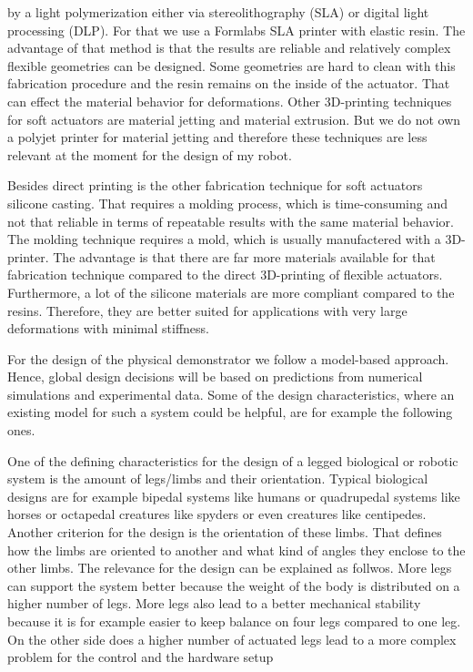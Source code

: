 by a light polymerization either via stereolithography (SLA) or digital light processing (DLP). For that we use a Formlabs SLA printer with elastic resin. The advantage of that method
is that the results are reliable and relatively complex flexible geometries can be designed. Some geometries are hard to clean with this fabrication procedure and the resin remains on
the inside of the actuator. That can effect the material behavior for deformations. Other 3D-printing techniques for soft actuators are material jetting and material extrusion. But we
do not own a polyjet printer for material jetting and therefore these techniques are less relevant at the moment for the design of my robot.
%
\par
Besides direct printing is the other fabrication technique for soft actuators silicone casting. That requires a molding process, which is time-consuming and not that reliable in terms
of repeatable results with the same material behavior. The molding technique requires a mold, which is usually manufactered with a 3D-printer. The advantage is that there are far more
materials available for that fabrication technique compared to the direct 3D-printing of flexible actuators. Furthermore, a lot of the silicone materials are more compliant compared to 
the resins. Therefore, they are better suited for applications with very large deformations with minimal stiffness.  
\par
For the design of the physical demonstrator we follow a model-based approach. Hence, global design decisions will be based on predictions 
from numerical simulations and experimental data. Some of the design characteristics, where an existing model for such a system could be helpful, are for example the following ones.
%
\par
One of the defining characteristics for the design of a legged biological or robotic system is the amount of legs/limbs and their orientation. Typical biological designs are
 for example bipedal systems like humans or quadrupedal systems like horses or octapedal creatures like spyders or even creatures like centipedes. Another criterion for the design
  is the orientation of these limbs. That defines how
 the limbs are oriented to another and what kind of angles they enclose to the other limbs. The relevance for the design can be explained as follwos. More legs can support the system
  better because the weight of the body is distributed on a higher number of legs. More legs also lead to a better mechanical stability because it is for example easier
 to keep balance on four legs compared to one leg. On the other side does a higher number of actuated legs lead to a more complex problem for the control and the hardware setup
